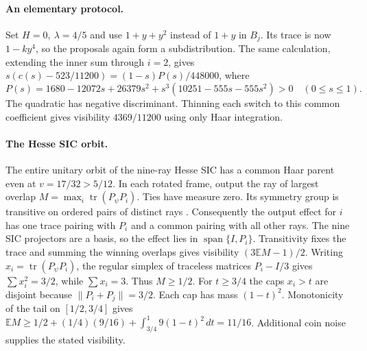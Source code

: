 \documentclass[10pt,a4paper]{article}
\newcommand{\tr}{\operatorname{tr}}
\newcommand{\E}{\mathbb E}
\begin{document}
\paragraph{An elementary protocol.}
Set \(H=0,\ \lambda=4/5\) and use \(1+y+y^2\) instead of \(1+y\) in \(B_j\). Its trace is now \(1-ky^4\), so the proposals again form a subdistribution.
The same calculation, extending the inner sum through \(i=2\), gives
\(s(c(s)-523/11200)=(1-s)P(s)/448000\), where
\[
 P(s)=1680-12072s+26379s^2+s^3(10251-555s-555s^2)>0
 \quad (0\le s\le1).
\]
The quadratic has negative discriminant. Thinning each switch to this common
coefficient gives visibility \(4369/11200\) using only Haar integration.
\paragraph{The Hesse SIC orbit.}
The entire unitary orbit of the nine-ray Hesse SIC has a common Haar parent
even at \(v=17/32>5/12\). In each rotated frame, output the ray of largest
overlap \(M=\max_i\tr(P_\psi P_i)\). Ties have measure zero. Its symmetry group
is transitive on ordered pairs of distinct rays
\cite{zhu}. Consequently the output effect
for \(i\) has one trace pairing with \(P_i\) and a common pairing with all
other rays. The nine SIC projectors are a basis, so the effect lies in
\(\operatorname{span}\{I,P_i\}\). Transitivity fixes the trace and summing
the winning overlaps gives visibility \((3\E M-1)/2\).
Writing \(x_i=\tr(P_\psi P_i)\), the regular simplex of traceless matrices
\(P_i-I/3\) gives \(\sum x_i^2=3/2\), while \(\sum x_i=3\). Thus \(M\ge1/2\).
For \(t\ge3/4\) the caps \(x_i>t\) are disjoint because
\(\|P_i+P_j\|=3/2\). Each cap has mass \((1-t)^2\).
Monotonicity of the tail on \([1/2,3/4]\) gives
\(\E M\ge1/2+(1/4)(9/16)+\int_{3/4}^1 9(1-t)^2\,dt=11/16\).
Additional coin noise supplies the stated visibility.
\end{document}
